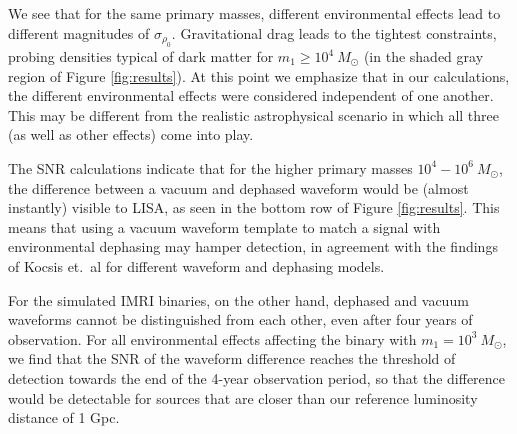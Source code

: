 \documentclass[10pt,a4paper,twoside]{article}
\begin{document}


We see that for the same primary masses, different environmental effects lead to different magnitudes of $\sigma_{\rho_0}$. Gravitational drag leads to the tightest constraints, probing densities typical of dark matter for $m_1 \geq 10^4 ~M_{\odot}$ (in the shaded gray region of Figure \ref{fig:results}). At this point we emphasize that in our calculations, the different environmental effects were considered independent of one another. This may be different from the realistic astrophysical scenario in which all three (as well as other effects) come into play. 




The SNR calculations indicate that for the higher primary masses $10^4-10^6 ~M_{\odot}$, the difference between a vacuum and dephased waveform would be (almost instantly) visible to LISA, as seen in the bottom row of Figure \ref{fig:results}. This means that using a vacuum waveform template to match a signal with environmental dephasing may hamper detection, in agreement with the findings of Kocsis et.~al \cite{Kocsis2011} for different waveform and dephasing models.

For the simulated IMRI binaries, on the other hand, dephased and vacuum waveforms cannot be distinguished from each other, even after four years of observation. For all environmental effects affecting the binary with $m_1 = 10^3 ~M_{\odot}$, we find that the SNR of the waveform difference reaches the threshold of detection towards the end of the 4-year observation period, so that the difference would be detectable for sources that are closer than our reference luminosity distance of 1 Gpc.
\end{document}
